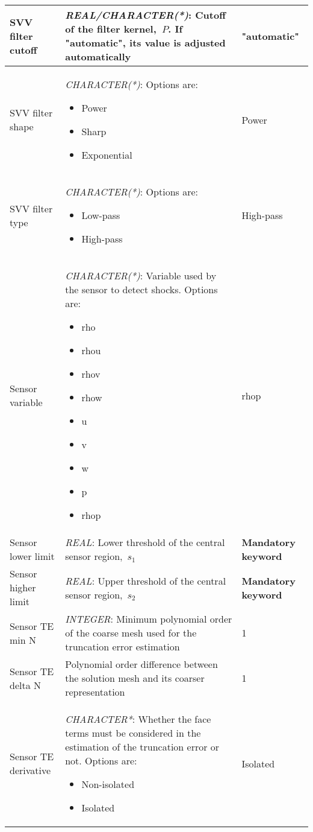 \documentclass[a4paper,10pt]{report}
\begin{document}
\begin{longtable}{|l|p{10cm}|p{2.2cm}|}
SVV filter cutoff & \textit{REAL/CHARACTER(*)}: Cutoff of the filter kernel,~$P$. If "automatic", its value is adjusted automatically & "automatic" \\ \hline
SVV filter shape & \textit{CHARACTER(*)}: Options are:
    \begin{itemize}
        \item Power
        \item Sharp
        \item Exponential
    \end{itemize} & Power \\ \hline
SVV filter type & \textit{CHARACTER(*)}: Options are:
    \begin{itemize}
        \item Low-pass
        \item High-pass
    \end{itemize} & High-pass \\ \hline
Sensor variable & \textit{CHARACTER(*)}: Variable used by the sensor to detect shocks. Options are:
    \begin{itemize}
        \item rho
        \item rhou
        \item rhov
        \item rhow
        \item u
        \item v
        \item w
        \item p
        \item rhop
    \end{itemize} & rhop \\ \hline
Sensor lower limit & \textit{REAL}: Lower threshold of the central sensor region,~$s_1$  & \textbf{Mandatory keyword} \\ \hline
Sensor higher limit & \textit{REAL}: Upper threshold of the central sensor region,~$s_2$ & \textbf{Mandatory keyword} \\ \hline
Sensor TE min N & \textit{INTEGER}: Minimum polynomial order of the coarse mesh used for the truncation error estimation & 1 \\ \hline
Sensor TE delta N & Polynomial order difference between the solution mesh and its coarser representation & 1 \\ \hline
Sensor TE derivative & \textit{CHARACTER*}: Whether the face terms must be considered in the estimation of the truncation error or not. Options are:
    \begin{itemize}
        \item Non-isolated
        \item Isolated
    \end{itemize} & Isolated \\ \hline
\end{longtable}
\end{document}
